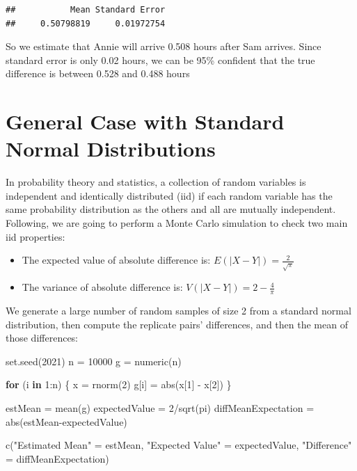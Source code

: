 \documentclass[
]{book}
\newenvironment{Shaded}{\begin{snugshade}}{\end{snugshade}}
\newcommand{\ControlFlowTok}[1]{\textcolor[rgb]{0.13,0.29,0.53}{\textbf{#1}}}
\newcommand{\DecValTok}[1]{\textcolor[rgb]{0.00,0.00,0.81}{#1}}
\newcommand{\FunctionTok}[1]{\textcolor[rgb]{0.00,0.00,0.00}{#1}}
\newcommand{\NormalTok}[1]{#1}
\newcommand{\OtherTok}[1]{\textcolor[rgb]{0.56,0.35,0.01}{#1}}
\newcommand{\SpecialCharTok}[1]{\textcolor[rgb]{0.00,0.00,0.00}{#1}}
\newcommand{\StringTok}[1]{\textcolor[rgb]{0.31,0.60,0.02}{#1}}
\providecommand{\tightlist}{%
  \setlength{\itemsep}{0pt}\setlength{\parskip}{0pt}}
\theoremstyle{definition}
\theoremstyle{definition}
\theoremstyle{definition}
\theoremstyle{definition}
\theoremstyle{remark}
\begin{document}
\begin{verbatim}
##           Mean Standard Error 
##     0.50798819     0.01972754
\end{verbatim}

So we estimate that Annie will arrive 0.508 hours after Sam arrives. Since standard error is only 0.02 hours, we can be 95\% confident that the true difference is between 0.528 and 0.488 hours

\hypertarget{general-case-with-standard-normal-distributions}{%
\section{General Case with Standard Normal Distributions}\label{general-case-with-standard-normal-distributions}}

In probability theory and statistics, a collection of random variables is independent and identically distributed (iid) if each random variable has the same probability distribution as the others and all are mutually independent. Following, we are going to perform a Monte Carlo simulation to check two main iid properties:

\begin{itemize}
\tightlist
\item
  The expected value of absolute difference is: \(E(|X-Y|)=\frac{2}{\sqrt{\pi}}\)
\item
  The variance of absolute difference is: \(V(|X-Y|) = 2- \frac{4}{\pi}\)
\end{itemize}

We generate a large number of random samples of size 2 from a standard normal distribution, then compute the replicate pairs' differences, and then the mean of those differences:

\begin{Shaded}
\begin{Highlighting}[]
\FunctionTok{set.seed}\NormalTok{(}\DecValTok{2021}\NormalTok{)}
\NormalTok{n }\OtherTok{=} \DecValTok{10000}
\NormalTok{g }\OtherTok{=} \FunctionTok{numeric}\NormalTok{(n)}

\ControlFlowTok{for}\NormalTok{ (i }\ControlFlowTok{in} \DecValTok{1}\SpecialCharTok{:}\NormalTok{n) \{}
\NormalTok{  x }\OtherTok{=} \FunctionTok{rnorm}\NormalTok{(}\DecValTok{2}\NormalTok{)}
\NormalTok{  g[i] }\OtherTok{=} \FunctionTok{abs}\NormalTok{(x[}\DecValTok{1}\NormalTok{] }\SpecialCharTok{{-}}\NormalTok{ x[}\DecValTok{2}\NormalTok{])}
\NormalTok{\}}

\NormalTok{estMean }\OtherTok{=} \FunctionTok{mean}\NormalTok{(g)}
\NormalTok{expectedValue }\OtherTok{=} \DecValTok{2}\SpecialCharTok{/}\FunctionTok{sqrt}\NormalTok{(pi)}
\NormalTok{diffMeanExpectation }\OtherTok{=} \FunctionTok{abs}\NormalTok{(estMean}\SpecialCharTok{{-}}\NormalTok{expectedValue)}

\FunctionTok{c}\NormalTok{(}\StringTok{"Estimated Mean"} \OtherTok{=}\NormalTok{ estMean, }\StringTok{"Expected Value"} \OtherTok{=}\NormalTok{ expectedValue, }\StringTok{"Difference"} \OtherTok{=}\NormalTok{ diffMeanExpectation)}
\end{Highlighting}
\end{Shaded}
\end{document}
